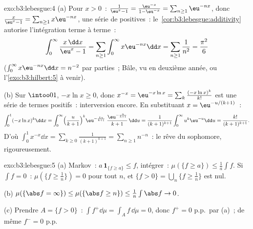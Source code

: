 \begin{solution}{exo:b3:lebesgue:4}
(a) Pour $x > 0$~: $\frac1{\eu^x - 1} =
\frac{\eu^{-x}}{1 - \eu^{-x}} = \sum_{n\geq1}\eu^{-nx}$,
donc $\frac{x}{\eu^x - 1} = \sum_{n\geq1}x\eu^{-nx}$, une
série de  positives~:
le~\cref{cor:b3:lebesgue:additivity} autorise l'intégration
terme à terme~:
\[
\int_0^\infty\frac{x\,\dd x}{\eu^x - 1}
= \sum_{n\geq1}\int_0^\infty x\eu^{-nx}\dd x
= \sum_{n\geq1}\frac1{n^2} = \frac{\pi^2}6
\]
($\int_0^\infty x\eu^{-nx}\dd x = n^{-2}$ par parties~;
Bâle, vu en deuxième année, ou
l'\cref{exo:b3:hilbert:5} à venir).

(b) Sur $\intoo01$, $-x\ln x \geq 0$, donc $x^{-x} =
\eu^{-x\ln x} = \sum_k\frac{(-x\ln x)^k}{k!}$ est une série
de termes positifs~: interversion encore. En substituant $x
= \eu^{-u/(k+1)}$~:
\[
\int_0^1(-x\ln x)^k\dd x
= \int_0^\infty\Bigl(\frac{u}{k+1}\Bigr)^{k}
\eu^{-\frac{ku}{k+1}}\;\frac{\eu^{-\frac u{k+1}}}{k+1}\,\dd u
= \frac{1}{(k+1)^{k+1}}\int_0^\infty u^k\eu^{-u}\dd u
= \frac{k!}{(k+1)^{k+1}} .
\]
D'où $\int_0^1x^{-x}\dd x = \sum_{k\geq0}\frac{1}{(k+1)^{k+1}}
= \sum_{n\geq1}n^{-n}$~: le rêve du sophomore, rigoureusement.
\end{solution}

\begin{solution}{exo:b3:lebesgue:5}
(a) Markov~: $a\,\mathbf 1_{\{f \geq a\}} \leq f$,
intégrer~: $\mu(\{f \geq a\}) \leq \frac1a\int f$. Si
$\int f = 0$~: $\mu(\{f \geq \frac1n\}) = 0$ pour tout $n$,
et $\{f > 0\} = \bigcup_n\{f \geq \frac1n\}$ est nul.

(b) $\mu(\{\abs f = \infty\}) \leq \mu(\{\abs f \geq n\})
\leq \frac1n\int\abs f \to 0$.

(c) Prendre $A = \{f > 0\}$~: $\int f^+\dd\mu =
\int_Af\,\dd\mu = 0$, donc $f^+ = 0$ p.p.\ par (a)~; de
même $f^- = 0$ p.p.
\end{solution}

